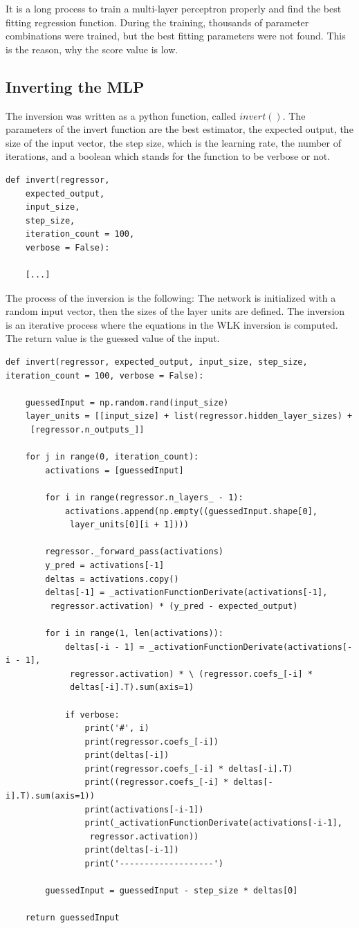 \medskip It is a long process to train a multi-layer perceptron properly and find the best fitting regression function. During the training, thousands of parameter combinations were trained, but the best fitting parameters were not found. This is the reason, why the score value is low.


\subsection{Inverting the MLP}

The inversion was written as a python function, called $invert()$. The parameters of the invert function are the best estimator, the expected output, the size of the input vector, the step size, which is the learning rate, the number of iterations, and a boolean which stands for the function to be verbose or not.
\begin{lstlisting}
def invert(regressor, 
	expected_output, 
	input_size, 
	step_size, 
	iteration_count = 100, 
	verbose = False):

	[...]
\end{lstlisting}
The process of the inversion is the following: The network is initialized with a random input vector, then the sizes of the layer units are defined. The inversion is an iterative process where the equations in the WLK inversion is computed. The return value is the guessed value of the input.
\begin{lstlisting}
def invert(regressor, expected_output, input_size, step_size, iteration_count = 100, verbose = False):

	guessedInput = np.random.rand(input_size)
	layer_units = [[input_size] + list(regressor.hidden_layer_sizes) +
	 [regressor.n_outputs_]]
	
	for j in range(0, iteration_count):
		activations = [guessedInput]

		for i in range(regressor.n_layers_ - 1):
			activations.append(np.empty((guessedInput.shape[0],
			 layer_units[0][i + 1])))

		regressor._forward_pass(activations)
		y_pred = activations[-1]
		deltas = activations.copy()
		deltas[-1] = _activationFunctionDerivate(activations[-1],
		 regressor.activation) * (y_pred - expected_output)

		for i in range(1, len(activations)):
			deltas[-i - 1] = _activationFunctionDerivate(activations[-i - 1],
			 regressor.activation) * \ (regressor.coefs_[-i] * 
			 deltas[-i].T).sum(axis=1)
			
			if verbose:
				print('#', i)
				print(regressor.coefs_[-i])
				print(deltas[-i])
				print(regressor.coefs_[-i] * deltas[-i].T)
				print((regressor.coefs_[-i] * deltas[-i].T).sum(axis=1))
				print(activations[-i-1])
				print(_activationFunctionDerivate(activations[-i-1],
				 regressor.activation))
				print(deltas[-i-1])
				print('-------------------')

		guessedInput = guessedInput - step_size * deltas[0]

	return guessedInput
\end{lstlisting}
